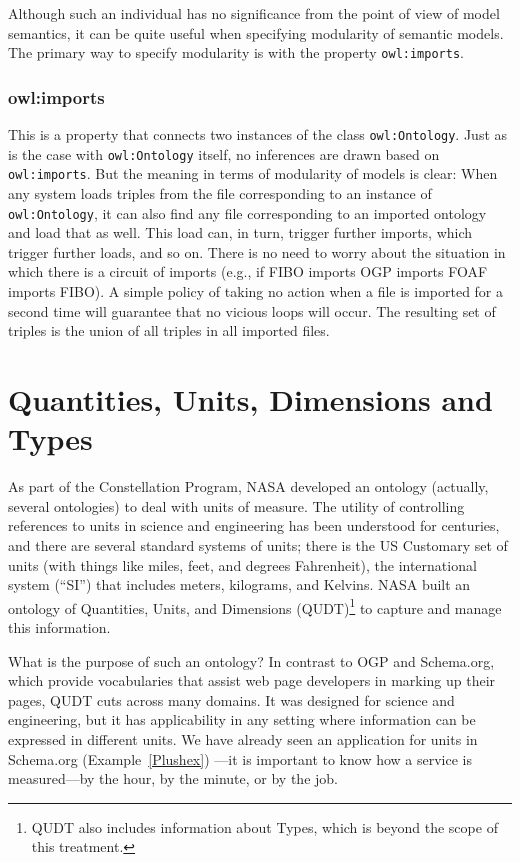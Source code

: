 Although such an individual has no significance from the point of view
of model semantics, it can
be quite useful when specifying modularity of semantic models. The
primary way to specify modularity is with the property \texttt{owl:imports}.

\subsubsection{owl:imports}

This is a property that connects two instances of the class
\texttt{owl:Ontology}. Just as is the case with \texttt{owl:Ontology} itself, no
inferences are drawn based on \texttt{owl:imports}. But the meaning in terms of
modularity of models is clear: When any system loads triples from the
file corresponding to an instance of \texttt{owl:Ontology}, it can also find any
file corresponding to an imported ontology and load that as well. This
load can, in turn, trigger further imports, which trigger further loads,
and so on. There is no need to worry about the situation in which there
is a circuit of imports (e.g., if FIBO imports OGP imports FOAF imports FIBO).
A simple policy of taking no action when a file is imported for a second
time will guarantee that no vicious loops will occur. The resulting set
of triples is the union of all triples in all imported files.




\section{Quantities, Units, Dimensions and Types}
\label{QUDT}

As part of the Constellation Program, NASA developed an ontology 
(actually, several ontologies) to deal
with units of measure. The utility of controlling references to units in
science and engineering has been understood for centuries, and there are
several standard systems of units; there is the US Customary set of
units (with things like miles, feet, and degrees Fahrenheit), the
international system (``SI'') that includes meters, kilograms, and
Kelvins. NASA built an ontology of Quantities, Units, and Dimensions
(QUDT)\footnote{QUDT also includes information about Types, which is beyond the scope
of this treatment.}
to capture and manage this information.

What is the purpose of such an ontology? In contrast to OGP and Schema.org, 
which provide vocabularies that assist web page developers in
marking up their pages, QUDT cuts across many domains. It was designed
for science and engineering, but it has applicability in any setting
where information can be expressed in different units. We have already
seen an application for units in Schema.org (Example~\ref{Plushex}) 
---it is
important to know how a service is measured---by the hour, by the
minute, or by the job.


